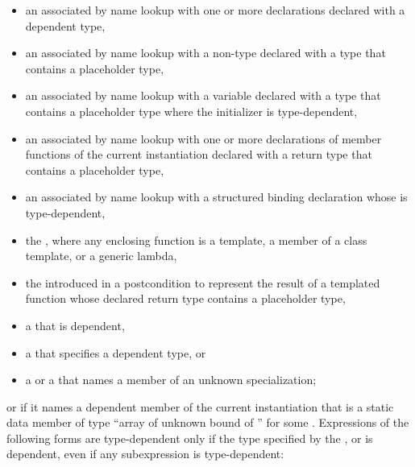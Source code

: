 \begin{itemize}
\item
an
associated by name lookup with one or more declarations
declared with a dependent type,

\item
an
associated by name lookup with
a non-type 
declared with a type
that contains a placeholder type,

\item
an
associated by name lookup with
a variable declared with a type that contains a placeholder type
where the initializer is type-dependent,

\item
an  associated by name lookup with one or more
declarations of member functions of the current instantiation declared
with a return type that contains a placeholder type,

\item
an  associated by name lookup with
a structured binding declaration whose
 is type-dependent,

\item
the
, where any enclosing function is a
template, a member of a class template, or a generic lambda,

\item
the  introduced in
a postcondition to represent the result of
a templated function whose declared return type contains a placeholder type,

\item
a
that is dependent,

\item
a
that specifies a dependent type, or

\item
a
or a
that names a member of an unknown specialization;
\end{itemize}

or if it names a dependent member of the current instantiation that is a static
data member of type
``array of unknown bound of '' for some .
Expressions of the following forms are type-dependent only if the type
specified by the
,
or
is dependent, even if any subexpression is type-dependent:

